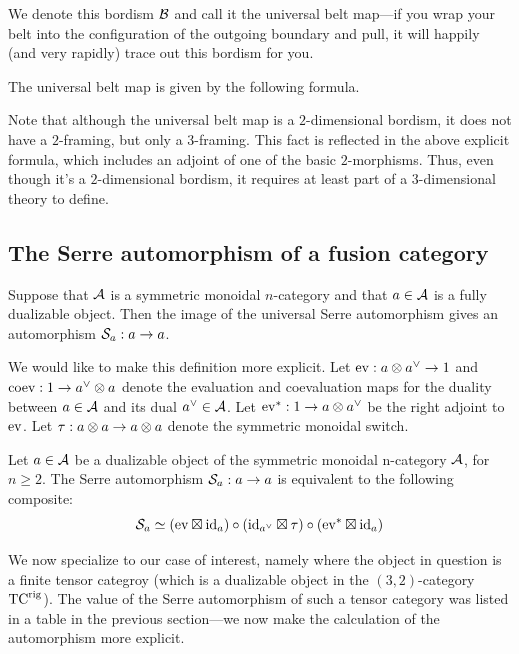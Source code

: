 \documentclass{amsart}
\begin{document}
We denote this bordism $\mathcal B$ and call it the universal belt map---if you wrap your belt into the configuration of the outgoing boundary and pull, it will happily (and very rapidly) trace out this bordism for you.

\begin{lemma}
The universal belt map is given by the following formula.   
\end{lemma}

\begin{remark}
Note that although the universal belt map is a $2$-dimensional bordism, it does not have a $2$-framing, but only a $3$-framing.  This fact is reflected in the above explicit formula, which includes an adjoint of one of the basic $2$-morphisms.  Thus, even though it's a $2$-dimensional bordism, it requires at least part of a $3$-dimensional theory to define.  
\end{remark}

\subsection{The Serre automorphism of a fusion category}

Suppose that $\mathcal A$ is a symmetric monoidal $n$-category and that $a \in \mathcal A$ is a fully dualizable object.  Then the image of the universal Serre automorphism gives an automorphism $\mathcal S_a: a \rightarrow a$.

We would like to make this definition more explicit.  Let $\mathrm{ev} : a \otimes a^{\vee} \rightarrow 1$ and $\mathrm{coev}: 1 \rightarrow a^{\vee} \otimes a$ denote the evaluation and coevaluation maps for the duality between $a \in \mathcal A$ and its dual $a^{\vee} \in \mathcal A$.  Let $\mathrm{ev}^*: 1 \rightarrow a \otimes a^{\vee}$ be the right adjoint to $\mathrm{ev}$.  Let $\tau: a \otimes a \rightarrow a \otimes a$ denote the symmetric monoidal switch.  

\begin{proposition}
Let $a \in \mathcal A$ be a dualizable object of the symmetric monoidal n-category $\mathcal A$, for $n \geq 2$.  The Serre automorphism $\mathcal S_a : a \rightarrow a$ is equivalent to the following composite:
\[
\mathcal S_a \simeq (\mathrm{ev} \boxtimes \mathrm{id}_a) \circ (\mathrm{id}_{a^{\vee}} \boxtimes \tau) \circ (\mathrm{ev}^{*} \boxtimes \mathrm{id}_a)
\]
\end{proposition}

We now specialize to our case of interest, namely where the object in question is a finite tensor categroy (which is a dualizable object in the $(3,2)$-category ${\mathrm{TC}^{\text{rig}}}$).  The value of the Serre automorphism of such a tensor category was listed in a table in the previous section---we now make the calculation of the automorphism more explicit.
\end{document}
